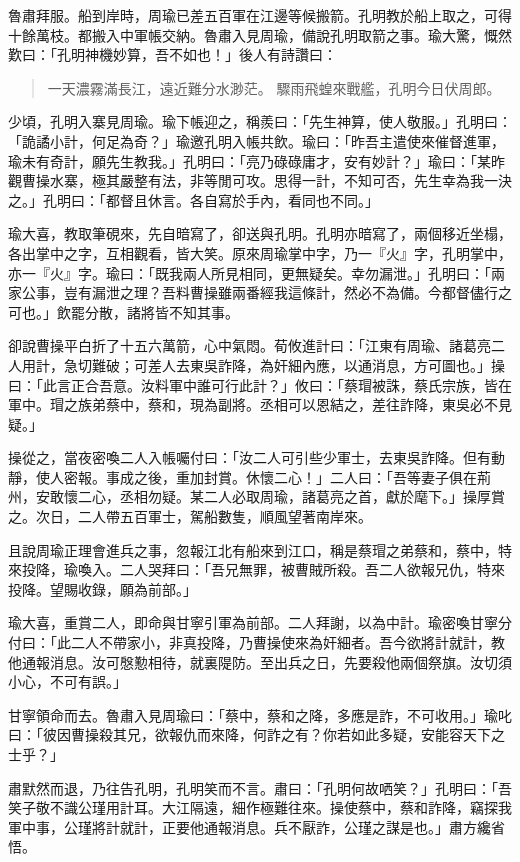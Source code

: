 魯肅拜服。船到岸時，周瑜已差五百軍在江邊等候搬箭。孔明教於船上取之，可得十餘萬枝。都搬入中軍帳交納。魯肅入見周瑜，備說孔明取箭之事。瑜大驚，慨然歎曰：「孔明神機妙算，吾不如也！」後人有詩讚曰：

\begin{quote}
一天濃霧滿長江，遠近難分水渺茫。
驟雨飛蝗來戰艦，孔明今日伏周郎。
\end{quote}

少頃，孔明入寨見周瑜。瑜下帳迎之，稱羨曰：「先生神算，使人敬服。」孔明曰：「詭譎小計，何足為奇？」瑜邀孔明入帳共飲。瑜曰：「昨吾主遣使來催督進軍，瑜未有奇計，願先生教我。」孔明曰：「亮乃碌碌庸才，安有妙計？」瑜曰：「某昨觀曹操水寨，極其嚴整有法，非等閒可攻。思得一計，不知可否，先生幸為我一決之。」孔明曰：「都督且休言。各自寫於手內，看同也不同。」

瑜大喜，教取筆硯來，先自暗寫了，卻送與孔明。孔明亦暗寫了，兩個移近坐榻，各出掌中之字，互相觀看，皆大笑。原來周瑜掌中字，乃一『火』字，孔明掌中，亦一『火』字。瑜曰：「既我兩人所見相同，更無疑矣。幸勿漏泄。」孔明曰：「兩家公事，豈有漏泄之理？吾料曹操雖兩番經我這條計，然必不為備。今都督儘行之可也。」飲罷分散，諸將皆不知其事。

卻說曹操平白折了十五六萬箭，心中氣悶。荀攸進計曰：「江東有周瑜、諸葛亮二人用計，急切難破；可差人去東吳詐降，為奸細內應，以通消息，方可圖也。」操曰：「此言正合吾意。汝料軍中誰可行此計？」攸曰：「蔡瑁被誅，蔡氏宗族，皆在軍中。瑁之族弟蔡中，蔡和，現為副將。丞相可以恩結之，差往詐降，東吳必不見疑。」

操從之，當夜密喚二人入帳囑付曰：「汝二人可引些少軍士，去東吳詐降。但有動靜，使人密報。事成之後，重加封賞。休懷二心！」二人曰：「吾等妻子俱在荊州，安敢懷二心，丞相勿疑。某二人必取周瑜，諸葛亮之首，獻於麾下。」操厚賞之。次日，二人帶五百軍士，駕船數隻，順風望著南岸來。

且說周瑜正理會進兵之事，忽報江北有船來到江口，稱是蔡瑁之弟蔡和，蔡中，特來投降，瑜喚入。二人哭拜曰：「吾兄無罪，被曹賊所殺。吾二人欲報兄仇，特來投降。望賜收錄，願為前部。」

瑜大喜，重賞二人，即命與甘寧引軍為前部。二人拜謝，以為中計。瑜密喚甘寧分付曰：「此二人不帶家小，非真投降，乃曹操使來為奸細者。吾今欲將計就計，教他通報消息。汝可慇懃相待，就裏隄防。至出兵之日，先要殺他兩個祭旗。汝切須小心，不可有誤。」

甘寧領命而去。魯肅入見周瑜曰：「蔡中，蔡和之降，多應是詐，不可收用。」瑜叱曰：「彼因曹操殺其兄，欲報仇而來降，何詐之有？你若如此多疑，安能容天下之士乎？」

肅默然而退，乃往告孔明，孔明笑而不言。肅曰：「孔明何故哂笑？」孔明曰：「吾笑子敬不識公瑾用計耳。大江隔遠，細作極難往來。操使蔡中，蔡和詐降，竊探我軍中事，公瑾將計就計，正要他通報消息。兵不厭詐，公瑾之謀是也。」肅方纔省悟。

